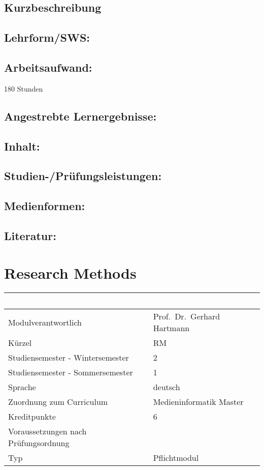 \section*{Kurzbeschreibung}\label{kurzbeschreibung-7}

\section*{Lehrform/SWS:}\label{lehrformsws-8}

\section*{Arbeitsaufwand:}\label{arbeitsaufwand-8}

180 Stunden

\section*{Angestrebte
Lernergebnisse:}\label{angestrebte-lernergebnisse-8}

\section*{Inhalt:}\label{inhalt-8}

\section*{Studien-/Prüfungsleistungen:}\label{studien-pruxfcfungsleistungen-8}

\section*{Medienformen:}\label{medienformen-8}

\section*{Literatur:}\label{literatur-8}

\chapter{Research Methods}\label{research-methods}

\begin{longtable}[]{@{}ll@{}}
\toprule
~ & ~\tabularnewline
\midrule
\endhead
Modulverantwortlich & Prof.~Dr.~Gerhard Hartmann\tabularnewline
Kürzel & RM\tabularnewline
Studiensemester - Wintersemester & 2\tabularnewline
Studiensemester - Sommersemester & 1\tabularnewline
Sprache & deutsch\tabularnewline
Zuordnung zum Curriculum & Medieninformatik Master\tabularnewline
Kreditpunkte & 6\tabularnewline
Voraussetzungen nach Prüfungsordnung &\tabularnewline
Typ & Pflichtmodul\tabularnewline
\bottomrule
\end{longtable}


